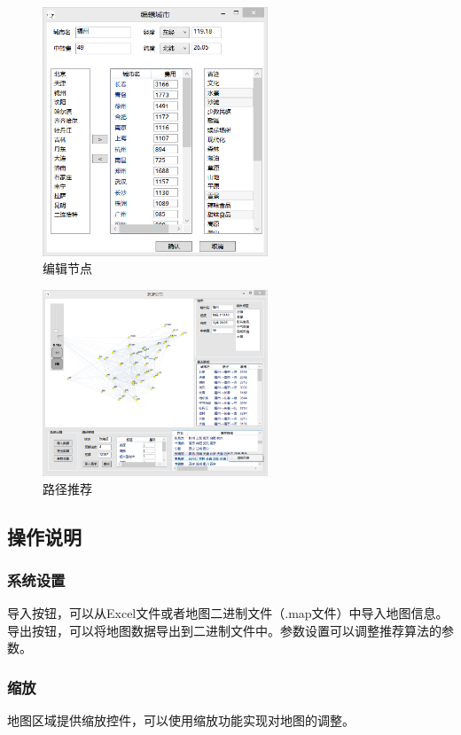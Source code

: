 \documentclass[12pt,a4paper]{article}
\begin{document}
\begin{figure}[H]
\centering
\includegraphics[width=0.6\textwidth]{4.png}
\caption{编辑节点} 
\end{figure}
\begin{figure}[H]
\centering
\includegraphics[width=0.6\textwidth]{5.png}
\caption{路径推荐} 
\end{figure}
\subsection{操作说明}
\subsubsection{系统设置}
导入按钮，可以从Excel文件或者地图二进制文件（.map文件）中导入地图信息。导出按钮，可以将地图数据导出到二进制文件中。参数设置可以调整推荐算法的参数。
\subsubsection{缩放}
地图区域提供缩放控件，可以使用缩放功能实现对地图的调整。
\end{document}

